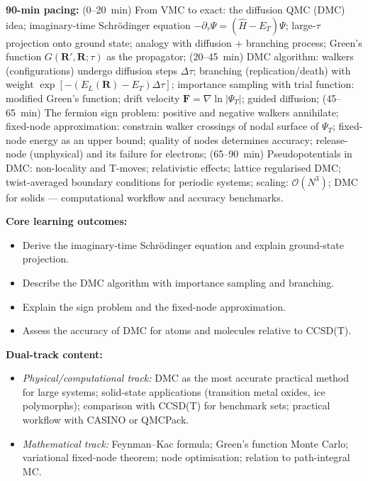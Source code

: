 \documentclass[11pt,a4paper]{article}
\begin{document}
\begin{tcolorbox}[modulebox, title={Module~II.1 / L06: Quantum Monte Carlo II --- Diffusion QMC}]
\textbf{90-min pacing:} (0--20~min) From VMC to exact: the diffusion QMC (DMC) idea;
imaginary-time Schr\"odinger equation $-\partial_\tau\Psi=(\hat{H}-E_T)\Psi$;
large-$\tau$ projection onto ground state; analogy with diffusion + branching process;
Green's function $G(\mathbf{R}',\mathbf{R};\tau)$ as the propagator;
(20--45~min) DMC algorithm: walkers (configurations) undergo diffusion steps $\Delta\tau$;
branching (replication/death) with weight $\exp[-(E_L(\mathbf{R})-E_T)\Delta\tau]$;
importance sampling with trial function: modified Green's function;
drift velocity $\mathbf{F}=\nabla\ln|\Psi_T|$; guided diffusion;
(45--65~min) The fermion sign problem: positive and negative walkers annihilate;
fixed-node approximation: constrain walker crossings of nodal surface of $\Psi_T$;
fixed-node energy as an upper bound; quality of nodes determines accuracy;
release-node (unphysical) and its failure for electrons;
(65--90~min) Pseudopotentials in DMC: non-locality and T-moves; relativistic effects;
lattice regularised DMC; twist-averaged boundary conditions for periodic systems;
scaling: $\mathcal{O}(N^3)$; DMC for solids --- computational workflow and accuracy benchmarks.

\medskip\textbf{Core learning outcomes:}
\begin{itemize}[leftmargin=1.4em,topsep=2pt,itemsep=1pt]
  \item Derive the imaginary-time Schr\"odinger equation and explain ground-state projection.
  \item Describe the DMC algorithm with importance sampling and branching.
  \item Explain the sign problem and the fixed-node approximation.
  \item Assess the accuracy of DMC for atoms and molecules relative to CCSD(T).
\end{itemize}

\medskip\textbf{Dual-track content:}
\begin{itemize}[leftmargin=1.4em,topsep=2pt,itemsep=1pt]
  \item \textit{Physical/computational track:} DMC as the most accurate practical
    method for large systems; solid-state applications (transition metal oxides, ice polymorphs);
    comparison with CCSD(T) for benchmark sets; practical workflow with CASINO or QMCPack.
  \item \textit{Mathematical track:} Feynman--Kac formula; Green's function Monte Carlo;
    variational fixed-node theorem; node optimisation; relation to path-integral MC.
\end{itemize}


\end{tcolorbox}
\end{document}
